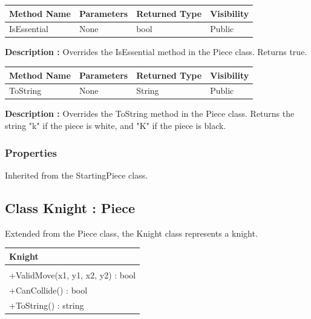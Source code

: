 \documentclass[12pt]{article}
\begin{document}
\begin{table}[H]
    \begin{tabular}{|l|l|l|l|}
    \hline
    \rowcolor[HTML]{EFEFEF} 
    \cellcolor[HTML]{EFEFEF}\textbf{Method Name} & \textbf{Parameters}  & \textbf{Returned Type} & \textbf{Visibility} \\ \hline
    IsEssential                                  & None                 & bool                   & Public              \\ \hline
    \end{tabular}
\end{table}

    \textbf{Description :} Overrides the IsEssential method in the Piece class.
    Returns true.

\begin{table}[H]
    \begin{tabular}{|l|l|l|l|}
    \hline
    \rowcolor[HTML]{EFEFEF} 
    \cellcolor[HTML]{EFEFEF}\textbf{Method Name} & \textbf{Parameters}  & \textbf{Returned Type} & \textbf{Visibility} \\ \hline
    ToString                                   & None                 & String                   & Public              \\ \hline
    \end{tabular}
\end{table}

    \textbf{Description :} Overrides the ToString method in the Piece class.
    Returns the string "k" if the piece is white, and "K" if the piece is black. 

\subsubsection{Properties}

    Inherited from the StartingPiece class.
\newpage


\subsection{Class Knight : Piece}

    Extended from the Piece class, the Knight class represents a knight.
\begin{table}[H]
    \begin{tabular}{|l|}
    \hline
    \cellcolor[HTML]{C0C0C0}\textbf{Knight} \\ \hline
    \cellcolor[HTML]{EFEFEF}                    \\ \hline
    +ValidMove(x1, y1, x2, y2) : bool           \\ \hline
    +CanCollide() : bool                        \\ \hline
    +ToString() : string                        \\ \hline
    \end{tabular}
\end{table}
\end{document}
